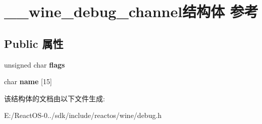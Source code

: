 \hypertarget{struct____wine__debug__channel}{}\section{\+\_\+\+\_\+wine\+\_\+debug\+\_\+channel结构体 参考}
\label{struct____wine__debug__channel}
\subsection*{Public 属性}
\begin{DoxyCompactItemize}
\item 
\mbox{\label{struct____wine__debug__channel_a4cdd07b7c4a941c2b3fba87ef9ff240c}} 
unsigned char {\bfseries flags}
\item 
\mbox{\label{struct____wine__debug__channel_a7b1dd696d139af43124d10be16e3032a}} 
char {\bfseries name} \mbox{[}15\mbox{]}
\end{DoxyCompactItemize}


该结构体的文档由以下文件生成\+:\begin{DoxyCompactItemize}
\item 
E\+:/\+React\+O\+S-\/0../sdk/include/reactos/wine/debug.\+h\end{DoxyCompactItemize}
